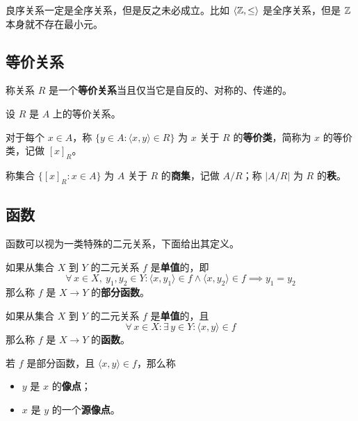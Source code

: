 良序关系一定是全序关系，但是反之未必成立。比如 $\langle \mathbb{Z}, \le \rangle$ 是全序关系，但是 $\mathbb{Z}$ 本身就不存在最小元。

\subsection{等价关系}

\begin{definition}[等价关系]
    称关系 $R$ 是一个\textbf{等价关系}当且仅当它是自反的、对称的、传递的。
\end{definition}

\begin{definition}[等价类]
    设 $R$ 是 $A$ 上的等价关系。

    对于每个 $x \in A$，称 $\{y \in A: \langle x, y \rangle \in R\}$ 为 $x$ 关于 $R$ 的\textbf{等价类}，简称为 $x$ 的等价类，记做 $[x]_R$。
    
    称集合 $\{[x]_R: x \in A\}$ 为 $A$ 关于 $R$ 的\textbf{商集}，记做 $A / R$；称 $|A / R|$ 为 $R$ 的\textbf{秩}。
\end{definition}

\subsection{函数}

函数可以视为一类特殊的二元关系，下面给出其定义。

\begin{definition}[部分函数]
    如果从集合 $X$ 到 $Y$ 的二元关系 $f$ 是\textbf{单值}的，即
    $$
    \forall\,x \in X,\ y_1, y_2 \in Y: \langle x, y_1 \rangle \in f \land \langle x, y_2 \rangle \in f \implies y_1 = y_2
    $$
    那么称 $f$ 是 $X \to Y$ 的\textbf{部分函数}。
\end{definition}

\begin{definition}[部分函数]
    如果从集合 $X$ 到 $Y$ 的二元关系 $f$ 是\textbf{单值}的，且
    $$
    \forall\,x \in X: \exists\,y \in Y: \langle x, y \rangle \in f
    $$
    那么称 $f$ 是 $X \to Y$ 的\textbf{函数}。
\end{definition}

若 $f$ 是部分函数，且 $\langle x, y \rangle \in f$，那么称

\begin{itemize}
    \item $y$ 是 $x$ 的\textbf{像点}；
    \item $x$ 是 $y$ 的一个\textbf{源像点}。
\end{itemize}

